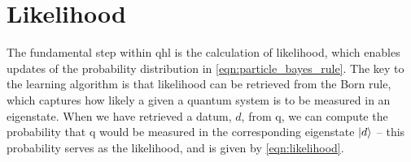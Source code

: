 \section{Likelihood}\label{sec:likelihood}
The fundamental step within \gls{qhl} is the calculation of  \gls{likelihood}, 
    which enables updates of the probability distribution in \cref{eqn:particle_bayes_rule}. 
The key to the learning algorithm is that \gls{likelihood} can be retrieved from the Born rule, 
    which captures how likely a given a quantum system is to be measured in an eigenstate.
When we have retrieved a datum, $d$, from \gls{q}, we can compute the probability that \gls{q} 
    would be measured in the corresponding eigenstate $\ket{d}$ -- this probability serves as the likelihood, 
    and is given by \cref{eqn:likelihood}.
\par 

